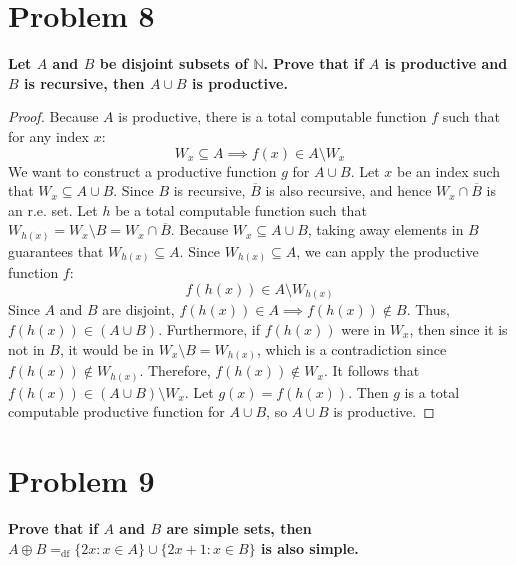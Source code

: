 \documentclass{article}
\begin{document}
\hrulefill

\section*{Problem 8}
\textbf{Let $A$ and $B$ be disjoint subsets of $\mathbb{N}$. Prove that if $A$ is productive and $B$ is recursive, then $A \cup B$ is productive.}

\begin{proof}
Because $A$ is productive, there is a total computable function $f$ such that for any index $x$:
\[ W_x \subseteq A \implies f(x) \in A \setminus W_x \]
We want to construct a productive function $g$ for $A \cup B$.
Let $x$ be an index such that $W_x \subseteq A \cup B$.
Since $B$ is recursive, $\overline{B}$ is also recursive, and hence $W_x \cap \overline{B}$ is an r.e. set.
Let $h$ be a total computable function such that $W_{h(x)} = W_x \setminus B = W_x \cap \overline{B}$.
Because $W_x \subseteq A \cup B$, taking away elements in $B$ guarantees that $W_{h(x)} \subseteq A$.
Since $W_{h(x)} \subseteq A$, we can apply the productive function $f$:
\[ f(h(x)) \in A \setminus W_{h(x)} \]
Since $A$ and $B$ are disjoint, $f(h(x)) \in A \implies f(h(x)) \notin B$. 
Thus, $f(h(x)) \in (A \cup B)$.
Furthermore, if $f(h(x))$ were in $W_x$, then since it is not in $B$, it would be in $W_x \setminus B = W_{h(x)}$, which is a contradiction since $f(h(x)) \notin W_{h(x)}$. Therefore, $f(h(x)) \notin W_x$.
It follows that $f(h(x)) \in (A \cup B) \setminus W_x$.
Let $g(x) = f(h(x))$. Then $g$ is a total computable productive function for $A \cup B$, so $A \cup B$ is productive.
\end{proof}

\hrulefill

\section*{Problem 9}
\textbf{Prove that if $A$ and $B$ are simple sets, then $A \oplus B =_{\text{df}} \{2x : x \in A\} \cup \{2x + 1 : x \in B\}$ is also simple.}
\end{document}
